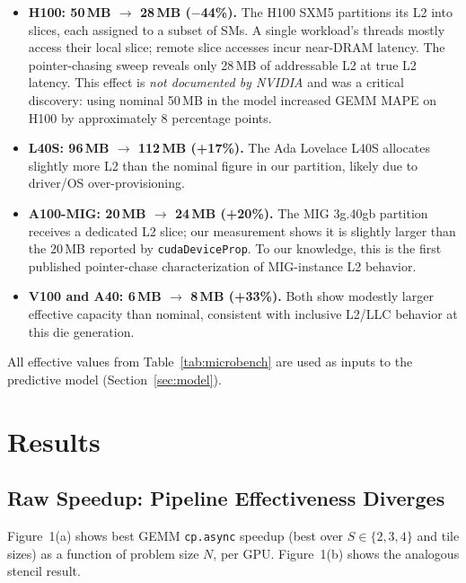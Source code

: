 \documentclass[sigplan,nonacm,10pt]{acmart}
\newcommand{\cpasync}{\texttt{cp.async}}
\begin{document}
\begin{itemize}
\item \textbf{H100: 50\,MB $\to$ 28\,MB ($-$44\%).}
  The H100 SXM5 partitions its L2 into slices, each assigned to a
  subset of SMs.
  A single workload's threads mostly access their local slice; remote
  slice accesses incur near-DRAM latency.
  The pointer-chasing sweep reveals only 28\,MB of addressable L2 at
  true L2 latency.
  This effect is \emph{not documented by NVIDIA} and was a critical
  discovery: using nominal 50\,MB in the model increased GEMM MAPE on
  H100 by approximately 8 percentage points.

\item \textbf{L40S: 96\,MB $\to$ 112\,MB (+17\%).}
  The Ada Lovelace L40S allocates slightly more L2 than the nominal
  figure in our partition, likely due to driver/OS over-provisioning.

\item \textbf{A100-MIG: 20\,MB $\to$ 24\,MB (+20\%).}
  The MIG 3g.40gb partition receives a dedicated L2 slice; our
  measurement shows it is slightly larger than the 20\,MB reported by
  \texttt{cudaDeviceProp}. To our knowledge, this is the first
  published pointer-chase characterization of MIG-instance L2 behavior.

\item \textbf{V100 and A40: 6\,MB $\to$ 8\,MB (+33\%).}
  Both show modestly larger effective capacity than nominal, consistent
  with inclusive L2/LLC behavior at this die generation.
\end{itemize}

All effective values from Table~\ref{tab:microbench} are used as inputs
to the predictive model (Section~\ref{sec:model}).

\section{Results}
\label{sec:results}

\subsection{Raw Speedup: Pipeline Effectiveness Diverges}

Figure~1(a) shows best GEMM \cpasync{} speedup (best over $S \in
\{2,3,4\}$ and tile sizes) as a function of problem size $N$, per GPU.
Figure~1(b) shows the analogous stencil result.
\end{document}
